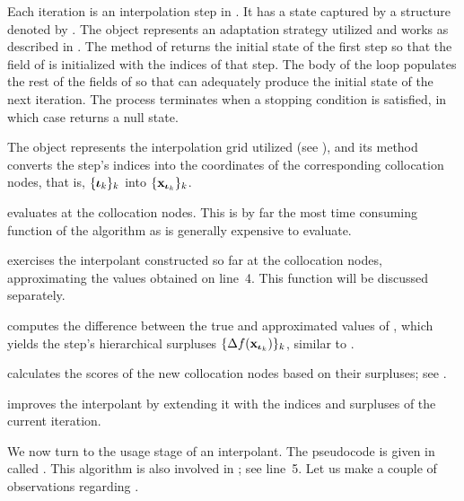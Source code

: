 \begin{compactlist}

 Each iteration is an interpolation step in .
It has a state captured by a structure denoted by . The
 object represents an adaptation strategy utilized and works as
described in . The  method of 
returns the initial state of the first step so that the  field of
 is initialized with the indices of that step. The body of the loop
populates the rest of the fields of  so that  can
adequately produce the initial state of the next iteration. The process
terminates when a stopping condition is satisfied, in which case 
returns a null state.

 The  object represents the interpolation grid
utilized (see ), and its  method converts the step's
indices into the coordinates of the corresponding collocation nodes, that is,
$\{ {\bm{\iota}}_k \}_k$ into $\{ \mathbf{x}_{{\bm{\iota}}_k} \}_k$.

  evaluates  at the collocation
nodes. This is by far the most time consuming function of the algorithm as
 is generally expensive to evaluate. 

  exercises the interpolant constructed so far at
the collocation nodes, approximating the values obtained on line~4. This
function will be discussed separately.

  computes the difference between the true and
approximated values of , which yields the step's hierarchical
surpluses $\{ \Delta f(\mathbf{x}_{{\bm{\iota}}_k}) \}_k$, similar to .

  calculates the scores of the new
collocation nodes based on their surpluses; see .

  improves the interpolant by extending it with the
indices and surpluses of the current iteration.

\end{compactlist}

We now turn to the usage stage of an interpolant. The pseudocode is given in
 called . This algorithm is also involved in
; see line~5. Let us make a couple of observations regarding
.

